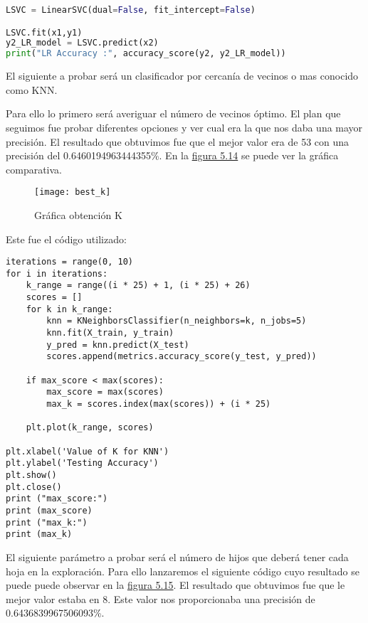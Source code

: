 \begin{lstlisting}[language=python]
LSVC = LinearSVC(dual=False, fit_intercept=False)

LSVC.fit(x1,y1)
y2_LR_model = LSVC.predict(x2)
print("LR Accuracy :", accuracy_score(y2, y2_LR_model))
\end{lstlisting}

El siguiente a probar será un clasificador por cercanía de vecinos o mas conocido como KNN.

Para ello lo primero será averiguar el número de vecinos óptimo. El plan que seguimos
fue probar diferentes opciones y ver cual era la que nos daba una mayor precisión. El resultado
que obtuvimos fue que el mejor valor era de 53 con una precisión del 0.6460194963444355\%.
En la \hyperref[fig:Gráfica obtención K]{figura 5.14} se puede ver la gráfica comparativa.

\begin{figure}[htb]
  \centering
    \texttt{[image: best\_k]}
  \caption[Gráfica obtención K]{Gráfica obtención K}
  \label{fig:Gráfica obtención K}
\end{figure}

Este fue el código utilizado:

\begin{lstlisting}
iterations = range(0, 10)
for i in iterations:
    k_range = range((i * 25) + 1, (i * 25) + 26)
    scores = []
    for k in k_range:
        knn = KNeighborsClassifier(n_neighbors=k, n_jobs=5)
        knn.fit(X_train, y_train)
        y_pred = knn.predict(X_test)
        scores.append(metrics.accuracy_score(y_test, y_pred))

    if max_score < max(scores):
        max_score = max(scores)
        max_k = scores.index(max(scores)) + (i * 25)

    plt.plot(k_range, scores)

plt.xlabel('Value of K for KNN')
plt.ylabel('Testing Accuracy')
plt.show()
plt.close()
print ("max_score:")
print (max_score)
print ("max_k:")
print (max_k)
\end{lstlisting}

El siguiente parámetro a probar será el número de hijos que deberá tener
cada hoja en la exploración. Para ello lanzaremos el siguiente código cuyo
resultado se puede puede observar en la \hyperref[fig:Gráfica obtención leaf size]{figura 5.15}. El resultado que obtuvimos
fue que le mejor valor estaba en 8. Este valor nos proporcionaba una precisión
de 0.6436839967506093\%. 

